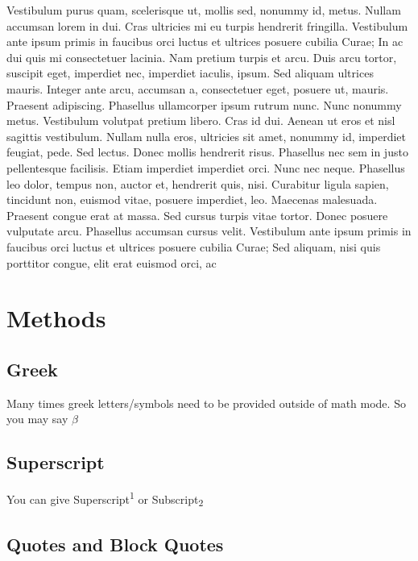 \documentclass[]{cik}%
\begin{document}
Vestibulum purus quam, scelerisque ut, mollis sed, nonummy id, metus.
Nullam accumsan lorem in dui. Cras ultricies mi eu turpis hendrerit
fringilla. Vestibulum ante ipsum primis in faucibus orci luctus et
ultrices posuere cubilia Curae; In ac dui quis mi consectetuer lacinia.
Nam pretium turpis et arcu. Duis arcu tortor, suscipit eget, imperdiet
nec, imperdiet iaculis, ipsum. Sed aliquam ultrices mauris. Integer ante
arcu, accumsan a, consectetuer eget, posuere ut, mauris. Praesent
adipiscing. Phasellus ullamcorper ipsum rutrum nunc. Nunc nonummy metus.
Vestibulum volutpat pretium libero. Cras id dui. Aenean ut eros et nisl
sagittis vestibulum. Nullam nulla eros, ultricies sit amet, nonummy id,
imperdiet feugiat, pede. Sed lectus. Donec mollis hendrerit risus.
Phasellus nec sem in justo pellentesque facilisis. Etiam imperdiet
imperdiet orci. Nunc nec neque. Phasellus leo dolor, tempus non, auctor
et, hendrerit quis, nisi. Curabitur ligula sapien, tincidunt non,
euismod vitae, posuere imperdiet, leo. Maecenas malesuada. Praesent
congue erat at massa. Sed cursus turpis vitae tortor. Donec posuere
vulputate arcu. Phasellus accumsan cursus velit. Vestibulum ante ipsum
primis in faucibus orci luctus et ultrices posuere cubilia Curae; Sed
aliquam, nisi quis porttitor congue, elit erat euismod orci, ac

\newpage

\hypertarget{methods}{%
\section{Methods}\label{methods}}

\hypertarget{greek}{%
\subsection{Greek}\label{greek}}

Many times greek letters/symbols need to be provided outside of math
mode. So you may say \(\beta\)

\hypertarget{superscript}{%
\subsection{Superscript}\label{superscript}}

You can give Superscript\textsuperscript{1} or
Subscript\textsubscript{2}

\hypertarget{quotes-and-block-quotes}{%
\subsection{Quotes and Block Quotes}\label{quotes-and-block-quotes}}
\end{document}
